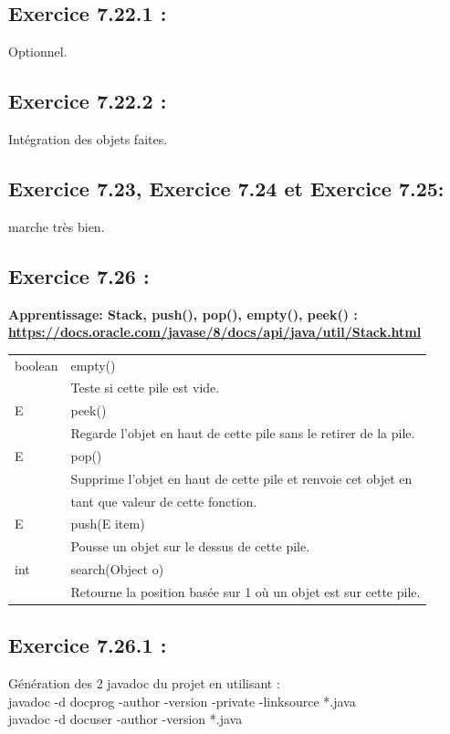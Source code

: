 \documentclass[french,10pt,a4paper]{report}
\begin{document}
\subsection{\textcolor{bb}{Exercice 7.22.1 :}}
Optionnel.

\subsection{\textcolor{bb}{Exercice 7.22.2 :}}
Intégration des objets faites.

\subsection{\textcolor{bb}{Exercice 7.23, Exercice 7.24 et Exercice 7.25:}}
marche très bien.

\subsection{\textcolor{bb}{Exercice 7.26 :}}
\textbf{\textcolor{gg}{Apprentissage: Stack, push(), pop(), empty(), peek() :}\\
\textcolor{bb}{\href{https://docs.oracle.com/javase/8/docs/api/java/util/Stack.html}{https://docs.oracle.com/javase/8/docs/api/java/util/Stack.html}}}
\begin{center}
\begin{tabular}{|l|l|}
\hline
boolean & empty() \\ & Teste si cette pile est vide. \\
\hline
E & peek()\\ & Regarde l'objet en haut de cette pile sans le retirer de la pile.\\
\hline
E &pop()\\ & Supprime l'objet en haut de cette pile et renvoie cet objet en\\ &  tant que valeur de cette fonction.\\
\hline
E & push(E item)\\ & Pousse un objet sur le dessus de cette pile.\\
\hline
int & search(Object o)\\ & Retourne la position basée sur 1 où un objet est sur cette pile.\\
\hline
\end{tabular}
\end{center}

\subsection{\textcolor{bb}{Exercice 7.26.1 :}}
Génération des 2 javadoc du projet en utilisant :\\
javadoc -d docprog -author -version -private -linksource *.java\\
javadoc -d docuser -author -version *.java
\end{document}
